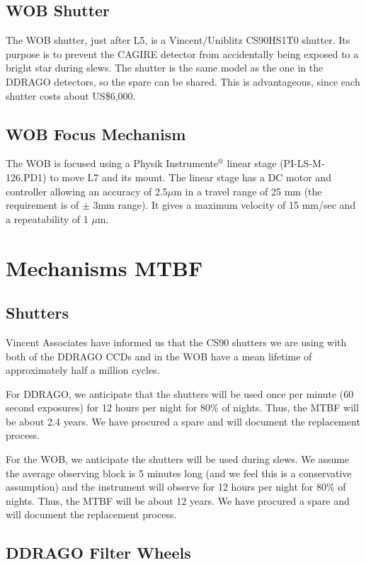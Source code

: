 \documentclass{report}
\begin{document}
\section{WOB Shutter}

The WOB shutter, just after L5, is a Vincent/Uniblitz CS90HS1T0 shutter. Its purpose is to prevent the CAGIRE detector from accidentally being exposed to a bright star during slews. The shutter is the same model as the one in the DDRAGO detectors, so the spare can be shared. This is advantageous, since each shutter costs about US\$6,000.

\section{WOB Focus Mechanism}

The WOB is focused using a Physik Instrumente${}^\circledR$ linear stage (PI-LS-M-126.PD1) to move L7 and its mount. The linear stage has a DC motor and controller allowing an accuracy of 2.5$\mu$m in a travel range of 25 mm (the requirement is of $\pm$ 3mm range). It gives a maximum velocity of 15 mm/sec and a repeatability of 1 $\mu$m. 

\chapter{Mechanisms MTBF}

\section{Shutters}

Vincent Associates have informed us that the CS90 shutters we are using with both of the DDRAGO CCDs and in the WOB have a mean lifetime of approximately half a million cycles.

For DDRAGO, we anticipate that the shutters will be used once per minute (60 second exposures) for 12 hours per night for 80\% of nights. Thus, the MTBF will be about 2.4 years. We have procured a spare and will document the replacement process.

For the WOB, we anticipate the shutters will be used during slews. We assume the average observing block is 5 minutes long (and we feel this is a conservative assumption) and the instrument will observe for 12 hours per night for 80\% of nights. Thus, the MTBF will be about 12 years. We have procured a spare and will document the replacement process.

\section{DDRAGO Filter Wheels}
\end{document}
